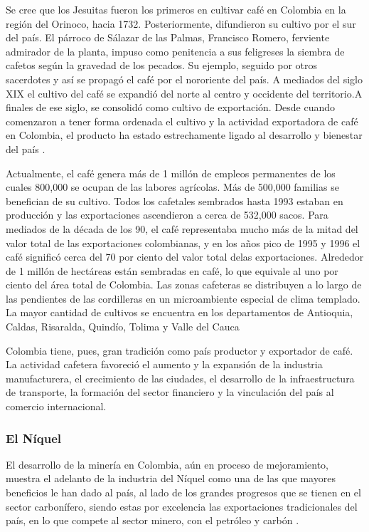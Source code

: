 \begin{spacing}{1.5}
Se cree que los Jesuitas fueron los primeros en cultivar café en Colombia en la región del Orinoco, hacia 1732. Posteriormente, difundieron su cultivo por el sur del país. El párroco de Sálazar de las Palmas, Francisco Romero, ferviente admirador de la planta, impuso como penitencia a sus feligreses la siembra de cafetos según la gravedad de los pecados. Su ejemplo, seguido por otros sacerdotes y así se propagó el café por el nororiente del país. A mediados del siglo XIX el cultivo del café se expandió del norte al centro y occidente del territorio.A finales de ese siglo, se consolidó como cultivo de exportación. Desde cuando comenzaron a tener forma ordenada el cultivo y la actividad exportadora de café en Colombia, el producto ha estado estrechamente ligado al desarrollo y bienestar del país \cite{cafeMain}.

Actualmente, el café genera más de 1 millón de empleos permanentes de los cuales 800,000 se ocupan de las labores agrícolas. Más de 500,000 familias se benefician de su cultivo. Todos los cafetales sembrados hasta 1993 estaban en producción y las exportaciones ascendieron a cerca de 532,000 sacos. Para mediados de la década de los 90, el café representaba mucho más de la mitad del valor total de las exportaciones colombianas, y en los años pico de 1995 y 1996 el café significó cerca del 70 por ciento del valor total delas exportaciones. Alrededor de 1 millón de hectáreas están sembradas en café, lo que equivale al uno por ciento del área total de Colombia. Las zonas cafeteras se distribuyen a lo largo de las pendientes de las cordilleras en un microambiente especial de clima templado. La mayor cantidad de cultivos se encuentra en los departamentos de Antioquia, Caldas, Risaralda, Quindío, Tolima y Valle del Cauca \cite{cafeMain}

Colombia tiene, pues, gran tradición como país productor y exportador de café. La actividad cafetera favoreció el aumento y la expansión de la industria manufacturera, el crecimiento de las ciudades, el desarrollo de la infraestructura de transporte, la formación del sector financiero y la vinculación del país al comercio internacional.

\subsubsection{El Níquel}
El  desarrollo  de  la  minería  en  Colombia, aún en proceso de mejoramiento, muestra el adelanto de la industria del Níquel como una de las que mayores beneficios le han dado  al  país,  al  lado  de  los  grandes  progresos que se tienen en el sector carbonífero, siendo estas por excelencia las exportaciones tradicionales del país, en lo que compete al sector minero, con el petróleo y carbón \cite{niquelMain}.


\end{spacing}
